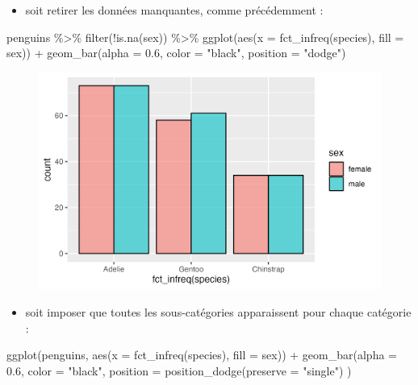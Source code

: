 \documentclass[
  letterpaper,
  DIV=11,
  numbers=noendperiod]{scrreprt}
\newenvironment{Shaded}{\begin{snugshade}}{\end{snugshade}}
\newcommand{\AttributeTok}[1]{\textcolor[rgb]{0.40,0.45,0.13}{#1}}
\newcommand{\FloatTok}[1]{\textcolor[rgb]{0.68,0.00,0.00}{#1}}
\newcommand{\FunctionTok}[1]{\textcolor[rgb]{0.28,0.35,0.67}{#1}}
\newcommand{\NormalTok}[1]{\textcolor[rgb]{0.00,0.23,0.31}{#1}}
\newcommand{\SpecialCharTok}[1]{\textcolor[rgb]{0.37,0.37,0.37}{#1}}
\newcommand{\StringTok}[1]{\textcolor[rgb]{0.13,0.47,0.30}{#1}}
\providecommand{\tightlist}{%
  \setlength{\itemsep}{0pt}\setlength{\parskip}{0pt}}\usepackage{longtable,booktabs,array}
\begin{document}
\begin{itemize}
\tightlist
\item
  soit retirer les données manquantes, comme précédemment :
\end{itemize}

\begin{Shaded}
\begin{Highlighting}[]
\NormalTok{penguins }\SpecialCharTok{\%\textgreater{}\%} 
  \FunctionTok{filter}\NormalTok{(}\SpecialCharTok{!}\FunctionTok{is.na}\NormalTok{(sex)) }\SpecialCharTok{\%\textgreater{}\%} 
  \FunctionTok{ggplot}\NormalTok{(}\FunctionTok{aes}\NormalTok{(}\AttributeTok{x =} \FunctionTok{fct\_infreq}\NormalTok{(species), }\AttributeTok{fill =}\NormalTok{ sex)) }\SpecialCharTok{+}
  \FunctionTok{geom\_bar}\NormalTok{(}\AttributeTok{alpha =} \FloatTok{0.6}\NormalTok{, }\AttributeTok{color =} \StringTok{"black"}\NormalTok{, }\AttributeTok{position =} \StringTok{"dodge"}\NormalTok{)}
\end{Highlighting}
\end{Shaded}

\begin{figure}[H]

{\centering \includegraphics{./03-visualization_files/figure-pdf/unnamed-chunk-59-1.png}

}

\end{figure}

\begin{itemize}
\tightlist
\item
  soit imposer que toutes les sous-catégories apparaissent pour chaque
  catégorie :
\end{itemize}

\begin{Shaded}
\begin{Highlighting}[]
\FunctionTok{ggplot}\NormalTok{(penguins, }\FunctionTok{aes}\NormalTok{(}\AttributeTok{x =} \FunctionTok{fct\_infreq}\NormalTok{(species), }\AttributeTok{fill =}\NormalTok{ sex)) }\SpecialCharTok{+}
  \FunctionTok{geom\_bar}\NormalTok{(}\AttributeTok{alpha =} \FloatTok{0.6}\NormalTok{, }\AttributeTok{color =} \StringTok{"black"}\NormalTok{,}
           \AttributeTok{position =} \FunctionTok{position\_dodge}\NormalTok{(}\AttributeTok{preserve =} \StringTok{"single"}\NormalTok{) )}
\end{Highlighting}
\end{Shaded}
\end{document}

